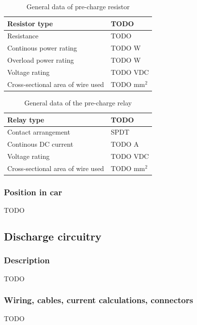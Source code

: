\documentclass{article}
\begin{document}
	\begin{table}[H]
	    \centering
	    \begin{tabular}{|l|l|}
	    \hline
	    Resistor type & TODO \\ \hline
	    Resistance & TODO \ohm \\ \hline
	    Continous power rating & TODO W \\ \hline
	    Overload power rating & TODO W \\ \hline
	    Voltage rating & TODO VDC \\ \hline
	    Cross-sectional area of wire used & TODO mm$^2$\\ \hline
	    \end{tabular}
	    \caption{General data of pre-charge resistor}
	    \label{prechargeresistor}
	\end{table}

	\begin{table}[H]
	    \centering
	    \begin{tabular}{|l|l|}
	    \hline
	    Relay type & TODO \\ \hline
	    Contact arrangement & SPDT \\ \hline
	    Continous DC current & TODO A \\ \hline
	    Voltage rating & TODO VDC \\ \hline
	    Cross-sectional area of wire used & TODO mm$^2$ \\ \hline
	    \end{tabular}
	    \caption{General data of the pre-charge relay}
	    \label{PCrelay}
	\end{table}

\subsubsection{Position in car}
TODO

\subsection{Discharge circuitry}
\subsubsection{Description}
TODO

\subsubsection{Wiring, cables, current calculations, connectors}
TODO
\end{document}
